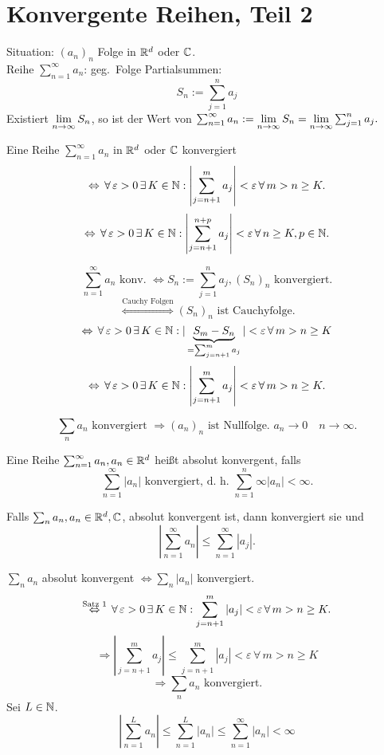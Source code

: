 \documentclass[../ana1.tex]{subfiles}
\begin{document}
\setcounter{section}{12}

\section{Konvergente Reihen, Teil 2}
Situation: \( {(a_n)}_n \) Folge in \( \mathbb{R}^d \) oder \( \mathbb{C} \).\\
Reihe \( \sum_{n=1}^\infty a_n \): geg.\ Folge Partialsummen:
\[ S_n := \sum_{j=1}^n a_j \]
Existiert \( \lim\limits_{n\rightarrow\infty} S_n \), so ist der Wert von \( \sum_{n=1}^\infty a_n := \lim\limits_{n\rightarrow\infty} S_n = \lim\limits_{n\rightarrow\infty} \sum_{j=1}^n a_j. \)
\begin{satz}[Cauchykriterium]
    Eine Reihe \( \sum_{n=1}^\infty a_n \) in \( \mathbb{R}^d \) oder \( \mathbb{C} \) konvergiert
    \[ \Leftrightarrow \, \forall \, \varepsilon > 0 \,\exists \, K\in\mathbb{N}: \left| \sum_{j=n+1}^m a_j \right| < \varepsilon \,\forall \, m>n\geq K. \]
    \[ \Leftrightarrow \, \forall \, \varepsilon > 0 \,\exists \, K\in\mathbb{N}: \left| \sum_{j=n+1}^{n+p} a_j \right| < \varepsilon \,\forall \, n\geq K, p\in\mathbb{N}. \]
\end{satz}
\begin{bew}
    \[ \sum_{n=1}^\infty a_n \text{ konv. } \Leftrightarrow S_n := \sum_{j=1}^n a_j, {(S_n)}_n \text{ konvergiert.} \]
    \[ \overset{\text{Cauchy Folgen}}{\Leftrightarrow} {(S_n)}_n \text{ ist Cauchyfolge.} \]
    \[ \Leftrightarrow \,\forall \, \varepsilon > 0 \,\exists \, K\in\mathbb{N}: |\underbrace{S_m - S_n}_{=\sum_{j=n+1}^m a_j}| < \varepsilon \,\forall \, m>n\geq K \]
    \[ \Leftrightarrow \,\forall \, \varepsilon > 0 \,\exists \, K\in\mathbb{N}: \left| \sum_{j=n+1}^m a_j \right| < \varepsilon \,\forall \, m>n\geq K. \]
\end{bew}
\begin{bem}
    \[ \sum_n a_n \text{ konvergiert } \Rightarrow {(a_n)}_n \text{ ist Nullfolge. } a_n \rightarrow 0 \quad n\rightarrow \infty. \]
\end{bem}
\begin{defi}
    Eine Reihe \( \sum_{n=1}^\infty a_n, a_n\in\mathbb{R}^d \) heißt absolut konvergent, falls
    \[ \sum_{n=1}^\infty |a_n| \text{ konvergiert, d.\ h.\ } \sum_{n=1}^n\infty |a_n| < \infty. \]
\end{defi}
\begin{satz}
    Falls \( \sum_n a_n, a_n\in\mathbb{R}^d,\mathbb{C} \), absolut konvergent ist, dann konvergiert sie und
    \[ \left| \sum_{n=1}^\infty a_n \right| \leq \sum_{n=1}^\infty |a_j|. \]
\end{satz}
\begin{bew}
    \( \sum_n a_n \) absolut konvergent \( \Leftrightarrow \sum_n |a_n| \) konvergiert.
    \[ \overset{\text{Satz 1}}{\Leftrightarrow} \,\forall \, \varepsilon > 0 \,\exists \, K\in\mathbb{N}: \sum_{j=n+1}^m |a_j| < \varepsilon \,\forall \, m>n\geq K. \]
    \[ \Rightarrow \left| \sum_{j=n+1}^m a_j \right| \leq \sum_{j=n+1}^m |a_j| < \varepsilon \,\forall \, m>n\geq K \]
    \[ \Rightarrow \sum_n a_n \text{ konvergiert.} \]
    Sei \( L \in\mathbb{N} \). 
    \[ \left| \sum_{n=1}^L a_n \right| \leq \sum_{n=1}^L |a_n| \leq \sum_{n=1}^\infty |a_n| < \infty \]
\end{bew}
\end{document}
